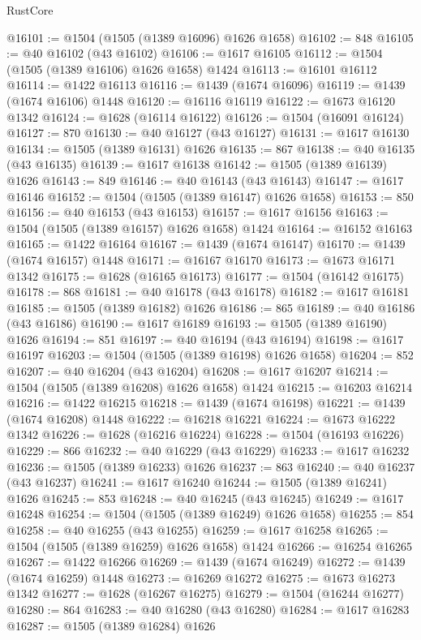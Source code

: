 \begin{lexlean}{RustCore}
\begin{coremodule}
@16101 := @1504 (@1505 (@1389 @16096) @1626 @1658)
@16102 := 848
@16105 := @40 @16102 (@43 @16102)
@16106 := @1617 @16105
@16112 := @1504 (@1505 (@1389 @16106) @1626 @1658) @1424
@16113 := @16101 @16112
@16114 := @1422 @16113
@16116 := @1439 (@1674 @16096)
@16119 := @1439 (@1674 @16106) @1448
@16120 := @16116 @16119
@16122 := @1673 @16120 @1342
@16124 := @1628 (@16114 @16122)
@16126 := @1504 (@16091 @16124)
@16127 := 870
@16130 := @40 @16127 (@43 @16127)
@16131 := @1617 @16130
@16134 := @1505 (@1389 @16131) @1626
@16135 := 867
@16138 := @40 @16135 (@43 @16135)
@16139 := @1617 @16138
@16142 := @1505 (@1389 @16139) @1626
@16143 := 849
@16146 := @40 @16143 (@43 @16143)
@16147 := @1617 @16146
@16152 := @1504 (@1505 (@1389 @16147) @1626 @1658)
@16153 := 850
@16156 := @40 @16153 (@43 @16153)
@16157 := @1617 @16156
@16163 := @1504 (@1505 (@1389 @16157) @1626 @1658) @1424
@16164 := @16152 @16163
@16165 := @1422 @16164
@16167 := @1439 (@1674 @16147)
@16170 := @1439 (@1674 @16157) @1448
@16171 := @16167 @16170
@16173 := @1673 @16171 @1342
@16175 := @1628 (@16165 @16173)
@16177 := @1504 (@16142 @16175)
@16178 := 868
@16181 := @40 @16178 (@43 @16178)
@16182 := @1617 @16181
@16185 := @1505 (@1389 @16182) @1626
@16186 := 865
@16189 := @40 @16186 (@43 @16186)
@16190 := @1617 @16189
@16193 := @1505 (@1389 @16190) @1626
@16194 := 851
@16197 := @40 @16194 (@43 @16194)
@16198 := @1617 @16197
@16203 := @1504 (@1505 (@1389 @16198) @1626 @1658)
@16204 := 852
@16207 := @40 @16204 (@43 @16204)
@16208 := @1617 @16207
@16214 := @1504 (@1505 (@1389 @16208) @1626 @1658) @1424
@16215 := @16203 @16214
@16216 := @1422 @16215
@16218 := @1439 (@1674 @16198)
@16221 := @1439 (@1674 @16208) @1448
@16222 := @16218 @16221
@16224 := @1673 @16222 @1342
@16226 := @1628 (@16216 @16224)
@16228 := @1504 (@16193 @16226)
@16229 := 866
@16232 := @40 @16229 (@43 @16229)
@16233 := @1617 @16232
@16236 := @1505 (@1389 @16233) @1626
@16237 := 863
@16240 := @40 @16237 (@43 @16237)
@16241 := @1617 @16240
@16244 := @1505 (@1389 @16241) @1626
@16245 := 853
@16248 := @40 @16245 (@43 @16245)
@16249 := @1617 @16248
@16254 := @1504 (@1505 (@1389 @16249) @1626 @1658)
@16255 := 854
@16258 := @40 @16255 (@43 @16255)
@16259 := @1617 @16258
@16265 := @1504 (@1505 (@1389 @16259) @1626 @1658) @1424
@16266 := @16254 @16265
@16267 := @1422 @16266
@16269 := @1439 (@1674 @16249)
@16272 := @1439 (@1674 @16259) @1448
@16273 := @16269 @16272
@16275 := @1673 @16273 @1342
@16277 := @1628 (@16267 @16275)
@16279 := @1504 (@16244 @16277)
@16280 := 864
@16283 := @40 @16280 (@43 @16280)
@16284 := @1617 @16283
@16287 := @1505 (@1389 @16284) @1626

\end{coremodule}
\end{lexlean}
